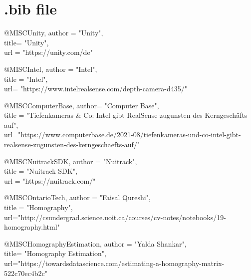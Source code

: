 \section{.bib file}

@MISC{Unity, 
	author = "Unity", \\
	title= "Unity", \\
	url = "https://unity.com/de"
}

@MISC{Intel, 
	author = "Intel", \\
	title = "Intel", \\
	url= "https://www.intelrealsense.com/depth-camera-d435/"
}

@MISC{ComputerBase, 
	author= "Computer Base", \\
	title = "Tiefenkameras {\&}  Co: Intel gibt RealSense zugunsten des Kerngesch{\"a}fts auf", \\
	url="https://www.computerbase.de/2021-08/tiefenkameras-und-co-intel-gibt-realsense-zugunsten-des-kerngeschaefts-auf/"
}

@MISC{NuitrackSDK, 
	author = "Nuitrack", \\
	title = "Nuitrack SDK", \\
	url = "https://nuitrack.com/"
}

@MISC{OntarioTech, 
	author = "Faisal Qureshi", \\
	title = "Homography", \\
	url="http://csundergrad.science.uoit.ca/courses/cv-notes/notebooks/19-homography.html"
}

@MISC{HomographyEstimation, 
	author = "Yalda Shankar", \\
	title= "Homography Estimation", \\
	url="https://towardsdatascience.com/estimating-a-homography-matrix-522c70ec4b2c"
}

